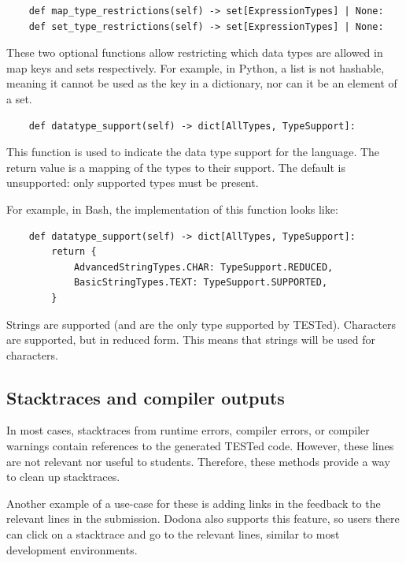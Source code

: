 \documentclass[../main]{subfiles}
\begin{document}
\begin{verbatim}
    def map_type_restrictions(self) -> set[ExpressionTypes] | None:
    def set_type_restrictions(self) -> set[ExpressionTypes] | None:
\end{verbatim}

These two optional functions allow restricting which data types are allowed in map keys and sets respectively.
For example, in Python, a list is not hashable, meaning it cannot be used as the key in a dictionary, nor can it be an element of a set.

\begin{verbatim}
    def datatype_support(self) -> dict[AllTypes, TypeSupport]:
\end{verbatim}

This function is used to indicate the data type support for the language.
The return value is a mapping of the types to their support.
The default is unsupported: only supported types must be present.

For example, in Bash, the implementation of this function looks like:

\begin{verbatim}
    def datatype_support(self) -> dict[AllTypes, TypeSupport]:
        return {
            AdvancedStringTypes.CHAR: TypeSupport.REDUCED,
            BasicStringTypes.TEXT: TypeSupport.SUPPORTED,
        }
\end{verbatim}

Strings are supported (and are the only type supported by TESTed).
Characters are supported, but in reduced form.
This means that strings will be used for characters.

\subsection{Stacktraces and compiler outputs}\label{subsec:error-messages-and-compiler-outputs}

In most cases, stacktraces from runtime errors, compiler errors, or compiler warnings contain references to the generated TESTed code.
However, these lines are not relevant nor useful to students.
Therefore, these methods provide a way to clean up stacktraces.

Another example of a use-case for these is adding links in the feedback to the relevant lines in the submission.
Dodona also supports this feature, so users there can click on a stacktrace and go to the relevant lines, similar to most development environments.
\end{document}

